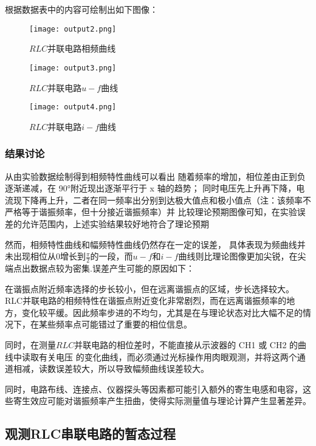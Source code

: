 \documentclass[UTF-8,twoside,cs4size]{ctexart}
\begin{document}
            根据数据表中的内容可绘制出如下图像：
            \begin{figure}[!h]
                \centering
                \texttt{[image: output2.png]}
                \caption{$ RLC $并联电路相频曲线}
            \end{figure}
            \begin{figure}[!h]
                \centering
                \texttt{[image: output3.png]}
                \caption{$ RLC $并联电路$u-f$曲线}
            \end{figure}
            \begin{figure}[!h]
                \centering
                \texttt{[image: output4.png]}
                \caption{$ RLC $并联电路$i-f$曲线}
            \end{figure}
            \newpage
            \subsubsection{结果讨论}
            从由实验数据绘制得到相频特性曲线可以看出
            随着频率的增加，相位差由正到负逐渐递减，在 90°附近现出逐渐平行于 x 轴的趋势；
            同时电压先上升再下降，电流现下降再上升，二者在同一频率出分别到达极大值点和极小值点（注：该频率不严格等于谐振频率，但十分接近谐振频率）并
            比较理论预期图像可知，在实验误差的允许范围内，上述实验结果较好地符合了理论预期
        
            然而，相频特性曲线和幅频特性曲线仍然存在一定的误差，
            具体表现为频曲线并未出现相位从0增长到$\frac{\pi}{2}$的一段，而$u-f$和$i-f$曲线则比理论图像更加尖锐，在尖端点出数据点较为密集.误差产生可能的原因如下：
        
            在谐振点附近频率选择的步长较小，但在远离谐振点的区域，步长选择较大。RLC并联电路的相频特性在谐振点附近变化非常剧烈，而在远离谐振频率的地方，变化较平缓。因此频率步进的不均匀，尤其是在与理论状态对比大幅不足的情况下，在某些频率点可能错过了重要的相位信息。
        
            同时，在测量$RLC$并联电路的相位差时，不能直接从示波器的 CH1 或 CH2 的曲线中读取有关电压
            的变化曲线，而必须通过光标操作用肉眼观测，并将这两个通道相减，读数误差较大，所以导致幅频曲线误差较大。
        
            同时，电路布线、连接点、仪器探头等因素都可能引入额外的寄生电感和电容，这些寄生效应可能对谐振频率产生扭曲，使得实际测量值与理论计算产生显著差异。
    
    \subsection{观测RLC串联电路的暂态过程}
\end{document}
